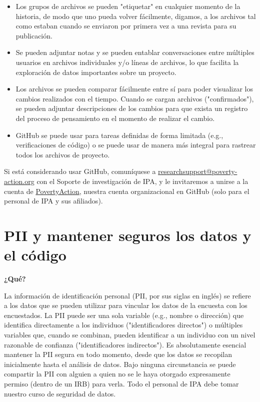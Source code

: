 \documentclass[11pt,en]{elegantpaper}
\begin{document}
\begin{itemize}
	\item Los grupos de archivos se pueden "etiquetar" en cualquier momento de la historia, de modo que uno pueda volver fácilmente, digamos, a los archivos tal como estaban cuando se enviaron por primera vez a una revista para su publicación.
	
	\item Se pueden adjuntar notas y se pueden entablar conversaciones entre múltiples usuarios en archivos individuales y/o líneas de archivos, lo que facilita la exploración de datos importantes sobre un proyecto.
	
	\item Los archivos se pueden comparar fácilmente entre sí para poder visualizar los cambios realizados con el tiempo. Cuando se cargan archivos ("confirmados"), se pueden adjuntar descripciones de los cambios para que exista un registro del proceso de pensamiento en el momento de realizar el cambio.
	
	\item GitHub se puede usar para tareas definidas de forma limitada (e.g., verificaciones de código) o se puede usar de manera más integral para rastrear todos los archivos de proyecto.
\end{itemize}

Si está considerando usar GitHub, comuníquese a \href{mailto:researchsupport@poverty-action.org}{researchsupport@poverty-action.org} con el Soporte de investigación de IPA, y le invitaremos a unirse a la cuenta de \href{https://github.com/PovertyAction}{PovertyAction}, nuestra cuenta organizacional en GitHub (solo para el personal de IPA y sus afiliados).

\newpage 
\section{PII y mantener seguros los datos y el código}
\label{sec:pii}

\noindent
\textbf{¿Qué?}

La información de identificación personal (PII, por sus siglas en inglés) se refiere a los datos que se pueden utilizar para vincular los datos de la encuesta con los encuestados. La PII puede ser una sola variable (e.g., nombre o dirección) que identifica directamente a los individuos ("identificadores directos") o múltiples variables que, cuando se combinan, pueden identificar a un individuo con un nivel razonable de confianza ("identificadores indirectos"). Es absolutamente esencial mantener la PII segura en todo momento, desde que los datos se recopilan inicialmente hasta el análisis de datos. Bajo ninguna circunstancia se puede compartir la PII con alguien a quien no se le haya otorgado expresamente permiso (dentro de un IRB) para verla. Todo el personal de IPA debe tomar nuestro curso de seguridad de datos.
\end{document}
